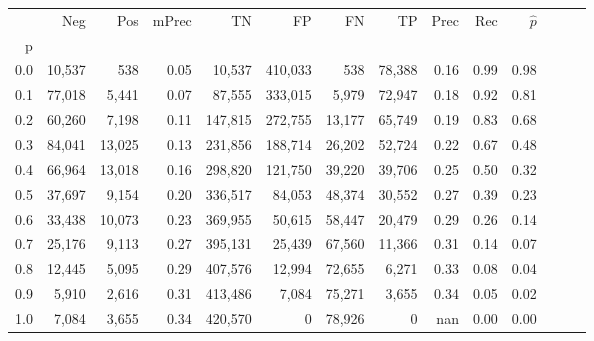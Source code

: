 \begin{tabular}{rrrrrrrrrrrrrr}
\toprule
{} &     Neg &     Pos & mPrec &       TN &       FP &      FN &      TP &  Prec &   Rec & $\hat{p}$ \\
p   &         &         &       &          &          &         &         &       &       &           \\
\midrule
0.0 &  10,537 &     538 &  0.05 &   10,537 &  410,033 &     538 &  78,388 &  0.16 &  0.99 &      0.98 \\
0.1 &  77,018 &   5,441 &  0.07 &   87,555 &  333,015 &   5,979 &  72,947 &  0.18 &  0.92 &      0.81 \\
0.2 &  60,260 &   7,198 &  0.11 &  147,815 &  272,755 &  13,177 &  65,749 &  0.19 &  0.83 &      0.68 \\
0.3 &  84,041 &  13,025 &  0.13 &  231,856 &  188,714 &  26,202 &  52,724 &  0.22 &  0.67 &      0.48 \\
0.4 &  66,964 &  13,018 &  0.16 &  298,820 &  121,750 &  39,220 &  39,706 &  0.25 &  0.50 &      0.32 \\
0.5 &  37,697 &   9,154 &  0.20 &  336,517 &   84,053 &  48,374 &  30,552 &  0.27 &  0.39 &      0.23 \\
0.6 &  33,438 &  10,073 &  0.23 &  369,955 &   50,615 &  58,447 &  20,479 &  0.29 &  0.26 &      0.14 \\
0.7 &  25,176 &   9,113 &  0.27 &  395,131 &   25,439 &  67,560 &  11,366 &  0.31 &  0.14 &      0.07 \\
0.8 &  12,445 &   5,095 &  0.29 &  407,576 &   12,994 &  72,655 &   6,271 &  0.33 &  0.08 &      0.04 \\
0.9 &   5,910 &   2,616 &  0.31 &  413,486 &    7,084 &  75,271 &   3,655 &  0.34 &  0.05 &      0.02 \\
1.0 &   7,084 &   3,655 &  0.34 &  420,570 &        0 &  78,926 &       0 &   nan &  0.00 &      0.00 \\
\bottomrule
\end{tabular}
